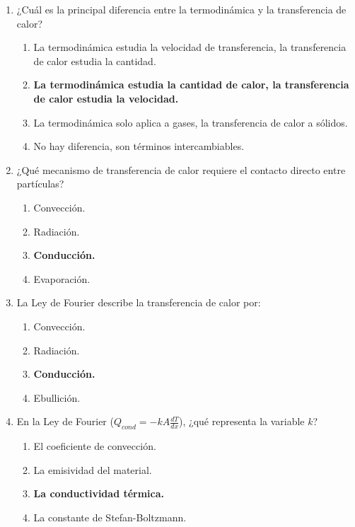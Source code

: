 \documentclass{article}
\begin{document}
\begin{enumerate}[label=\arabic*.]

    \item ¿Cuál es la principal diferencia entre la termodinámica y la transferencia de calor?
    \begin{enumerate}[label=\alph*)]
        \item La termodinámica estudia la velocidad de transferencia, la transferencia de calor estudia la cantidad.
        \item \textbf{La termodinámica estudia la cantidad de calor, la transferencia de calor estudia la velocidad.}
        \item La termodinámica solo aplica a gases, la transferencia de calor a sólidos.
        \item No hay diferencia, son términos intercambiables.
    \end{enumerate}

    \item ¿Qué mecanismo de transferencia de calor requiere el contacto directo entre partículas?
    \begin{enumerate}[label=\alph*)]
        \item Convección.
        \item Radiación.
        \item \textbf{Conducción.}
        \item Evaporación.
    \end{enumerate}

    \item La Ley de Fourier describe la transferencia de calor por:
    \begin{enumerate}[label=\alph*)]
        \item Convección.
        \item Radiación.
        \item \textbf{Conducción.}
        \item Ebullición.
    \end{enumerate}

    \item En la Ley de Fourier ($Q_{cond} = -k A \frac{dT}{dx}$), ¿qué representa la variable $k$?
    \begin{enumerate}[label=\alph*)]
        \item El coeficiente de convección.
        \item La emisividad del material.
        \item \textbf{La conductividad térmica.}
        \item La constante de Stefan-Boltzmann.
    \end{enumerate}


\end{enumerate}
\end{document}
